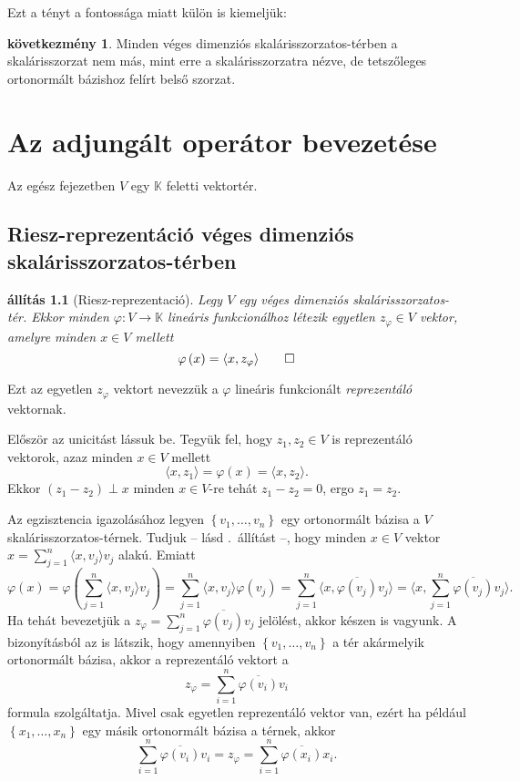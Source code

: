 \documentclass[9pt, a4paper, showtrims]{memoir}
\makeatletter
\renewenvironment{proof}[1][\proofname]
    {\par\pushQED{\qed}%
    \normalfont \topsep6\p@\@plus6\p@\relax
    \trivlist
    \item[\hskip\labelsep
        \itshape
    #1\@addpunct{:}]\ignorespaces}
    {\popQED\endtrivlist\@endpefalse}
\theoremstyle{plain}
\newtheorem{proposition}{állítás}[chapter]
\theoremstyle{remark}
\theoremstyle{definition}
\newtheorem{corollary}[proposition]{következmény}
\newcommand{\ip}[2]{\langle#1,#2\rangle}
\makeatother
\begin{document}
Ezt a tényt a fontossága miatt külön is kiemeljük:
\begin{corollary}
	Minden véges dimenziós skalárisszorzatos-térben a skalárisszorzat nem más,
	mint erre a skalárisszorzatra nézve,
	de tetszőleges ortonormált bázishoz felírt belső szorzat.
\end{corollary}

\chapter{Az adjungált operátor bevezetése}
Az egész fejezetben $V$ egy $\mathbb{K}$ feletti vektortér.
\section{Riesz-reprezentáció véges dimenziós skalárisszorzatos-térben}
\begin{proposition}[Riesz-reprezentació]\label{pr:Riesz}
	Legy $V$ egy véges dimenziós skalárisszorzatos-tér.
	Ekkor minden $\varphi:V\to\mathbb{K}$ lineáris funkcionálhoz létezik egyetlen $z_\varphi\in V$ vektor,
	amelyre minden $x\in V$ mellett
	\[
		\varphi\left( x \right)=\ip{x}{z_\varphi}
		\qedhere
	\]
\end{proposition}
Ezt az egyetlen $z_\varphi$ vektort nevezzük a $\varphi$ lineáris funkcionált \emph{reprezentáló} vektornak.
\begin{proof}
	Először az unicitást lássuk be.
	Tegyük fel, hogy $z_1,z_2\in V$ is reprezentáló vektorok,
	azaz minden $x\in V$ mellett
	\[
		\ip{x}{z_1}
		=
		\varphi\left( x \right)
		=
		\ip{x}{z_2}.
	\]
	Ekkor $(z_1-z_2)\perp x$ minden $x\in V$-re tehát $z_1-z_2=0$,
	ergo $z_1=z_2$.

	Az egzisztencia igazolásához legyen $\left\{ v_1,\ldots,v_n \right\}$ egy ortonormált bázisa a $V$ skalárisszorzatos-térnek.
	Tudjuk -- lásd .~állítást --, hogy minden $x\in V$ vektor
	\begin{math}
		x=
		\sum_{j=1}^n\ip{x}{v_j}v_j
	\end{math}
	alakú.
	Emiatt
	\[
		\varphi\left( x \right)
		=
		\varphi\left(
		\sum_{j=1}^n\ip{x}{v_j}v_j
		\right)
		=
		\sum_{j=1}^n
		\ip{x}{v_j}
		\varphi\left(
		v_j
		\right)
		=
		\sum_{j=1}^n
		\ip{x}{\overline{\varphi\left(
				v_j\right)}
			v_j}
		=
		\ip{x}{
			\sum_{j=1}^n
			\overline{\varphi\left(
				v_j\right)}
			v_j}.
	\]
	Ha tehát bevezetjük a
	\begin{math}
		z_\varphi
		=
		\sum_{j=1}^n
		\overline{\varphi\left(
			v_j\right)}v_j
	\end{math}
	jelölést, akkor készen is vagyunk.
\end{proof}
A bizonyításból az is látszik, hogy amennyiben
$\left\{ v_1,\ldots,v_n \right\}$ a tér akármelyik ortonormált bázisa,
akkor a reprezentáló vektort a
\[
	z_\varphi=
	\sum_{i=1}^n\overline{\varphi\left( v_i \right)}v_i
\]
formula szolgáltatja.
Mivel csak egyetlen reprezentáló vektor van, ezért ha például
$\left\{ x_1,\ldots,x_n \right\}$ egy másik ortonormált bázisa a térnek,
akkor
\[
	\sum_{i=1}^n\overline{\varphi\left( v_i \right)}v_i
	=
	z_\varphi
	=
	\sum_{i=1}^n\overline{\varphi\left( x_i \right)}x_i.
\]
\end{document}
